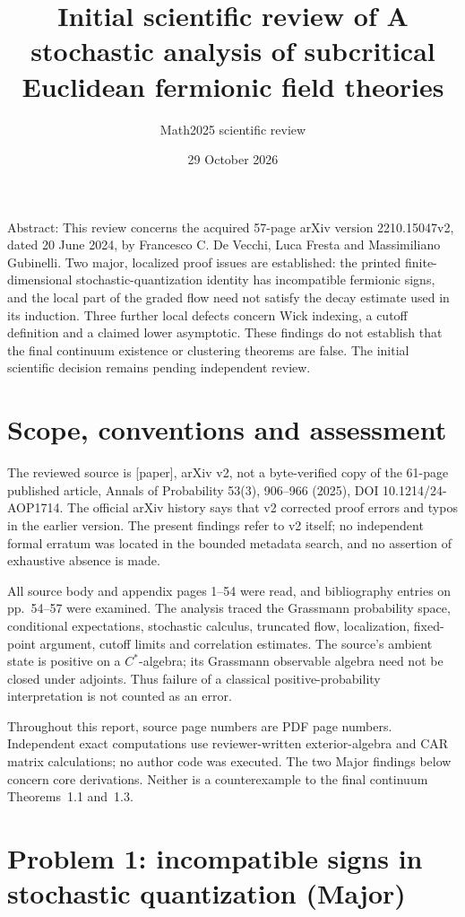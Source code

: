 \documentclass[10pt]{article}
\title{Initial scientific review of
A stochastic analysis of subcritical Euclidean fermionic field theories}
\author{Math2025 scientific review}
\date{29 October 2026}
\begin{document}
\maketitle
Abstract: This review concerns the acquired 57-page arXiv version 2210.15047v2, dated 20 June 2024, by Francesco C. De Vecchi, Luca Fresta and Massimiliano Gubinelli. Two major, localized proof issues are established: the printed finite-dimensional stochastic-quantization identity has incompatible fermionic signs, and the local part of the graded flow need not satisfy the decay estimate used in its induction. Three further local defects concern Wick indexing, a cutoff definition and a claimed lower asymptotic. These findings do not establish that the final continuum existence or clustering theorems are false. The initial scientific decision remains pending independent review.\par
\section*{Scope, conventions and assessment}
The reviewed source is [paper], arXiv v2, not a byte-verified copy of the 61-page published article, Annals of Probability 53(3), 906–966 (2025), DOI 10.1214/24-AOP1714. The official arXiv history says that v2 corrected proof errors and typos in the earlier version. The present findings refer to v2 itself; no independent formal erratum was located in the bounded metadata search, and no assertion of exhaustive absence is made.\par
All source body and appendix pages 1–54 were read, and bibliography entries on pp. 54–57 were examined. The analysis traced the Grassmann probability space, conditional expectations, stochastic calculus, truncated flow, localization, fixed-point argument, cutoff limits and correlation estimates. The source’s ambient state is positive on a \(C^*\)-algebra; its Grassmann observable algebra need not be closed under adjoints. Thus failure of a classical positive-probability interpretation is not counted as an error.\par
Throughout this report, source page numbers are PDF page numbers. Independent exact computations use reviewer-written exterior-algebra and CAR matrix calculations; no author code was executed. The two Major findings below concern core derivations. Neither is a counterexample to the final continuum Theorems 1.1 and 1.3.\par
\section*{Problem 1: incompatible signs in stochastic quantization (Major)}
\end{document}
